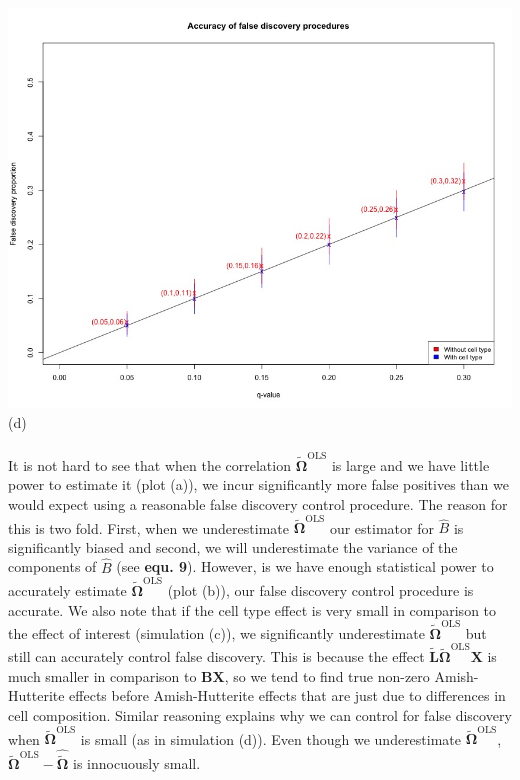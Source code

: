 \documentclass{article}
\begin{document}
\includegraphics[scale=0.25]{Fdp_1p3p0_0p33xcorr.jpeg}(d)\\
\\
It is not hard to see that when the correlation $\tilde{\bm{\Omega}}^{\text{OLS}}$ is large and we have little power to estimate it (plot (a)), we incur significantly more false positives than we would expect using a reasonable false discovery control procedure. The reason for this is two fold. First, when we underestimate $\tilde{\bm{\Omega}}^{\text{OLS}}$ our estimator for $\hat{B}$ is significantly biased and second, we will underestimate the variance of the components of $\hat{B}$ (see \textbf{equ. 9}). However, is we have enough statistical power to accurately estimate $\tilde{\bm{\Omega}}^{\text{OLS}}$ (plot (b)), our false discovery control procedure is accurate. We also note that if the cell type effect is very small in comparison to the effect of interest (simulation (c)), we significantly underestimate $\tilde{\bm{\Omega}}^{\text{OLS}}$ but still can accurately control false discovery. This is because the effect $\tilde{\bm{L}}\tilde{\bm{\Omega}}^{\text{OLS}} \bm{X}$ is much smaller in comparison to $\bm{B}\bm{X}$, so we tend to find true non-zero Amish-Hutterite effects before Amish-Hutterite effects that are just due to differences in cell composition. Similar reasoning explains why we can control for false discovery when $\tilde{\bm{\Omega}}^{\text{OLS}}$ is small (as in simulation (d)). Even though we underestimate $\tilde{\bm{\Omega}}^{\text{OLS}}$, $\tilde{\bm{\Omega}}^{\text{OLS}} - \hat{\tilde{\bm{\Omega}}}$ is innocuously small.
\end{document}
